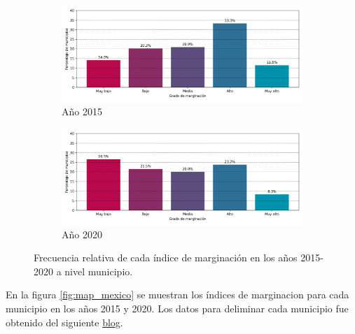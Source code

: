 \begin{figure}[H]
    \centering
    \begin{subfigure}{8.4cm}
        \caption{Año 2015}
        \includegraphics[width=1\linewidth]{Graphics/Data_2015/histogram_classes.png}
    \end{subfigure}
    \begin{subfigure}{8.4cm}
        \caption{Año 2020}
        \includegraphics[width=1\linewidth]{Graphics/Data_2020/histogram_classes.png}
    \end{subfigure}
    \caption{Frecuencia relativa de cada índice de marginación en los años 2015-2020 a nivel municipio.}
    \label{fig:frecuency_relative}
\end{figure}

En la figura \ref{fig:map_mexico} se muestran los índices de marginacion para cada municipio en los años 2015 y 2020. Los datos para deliminar cada municipio fue obtenido del siguiente \href{https://blog.jjsantoso.com/mapas-distribucion-puntos/}{blog}\cite{mapa_mexico}.

